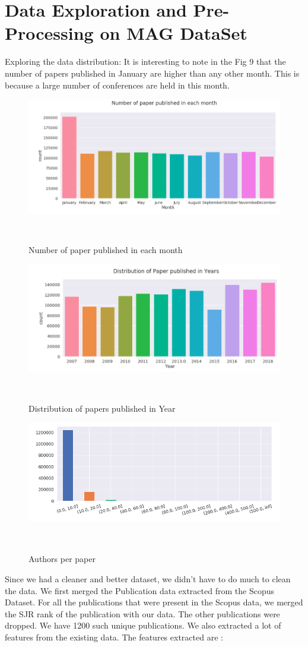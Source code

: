 \documentclass[a4paper, 11pt]{article}
\begin{document}
\section*{Data Exploration and Pre-Processing on MAG DataSet}
Exploring the data distribution: It is interesting to note in the Fig 9 that the number of papers published in January are higher than any other month. This is because a large number of conferences are held in this month.
\begin{figure}[ht]
  \includegraphics[width=0.6\columnwidth]{Month_Distribution.png}
  \caption{Number of paper published in each month}~\label{fig:Reach}
\end{figure}
\FloatBarrier
\begin{figure}[ht]
  \includegraphics[width=0.6\columnwidth]{Year_Distribution.png}
  \caption{Distribution of papers published in Year}~\label{fig:Reach}
\end{figure}
\FloatBarrier
\begin{figure}[ht]
  \includegraphics[width=0.6\columnwidth]{Number_Of_Authors.png}
  \caption{Authors per paper}~\label{fig:Reach}
\end{figure}
\FloatBarrier
Since we had a cleaner and better dataset, we didn't have to do much to clean the data. We first merged the Publication data extracted from the Scopus Dataset. For all the publications that were present in the Scopus data, we merged the SJR rank of the publication with our data. The other publications were dropped. We have 1200 such unique publications. We also extracted a lot of features from the existing data.  The features extracted are :\newline
\end{document}
